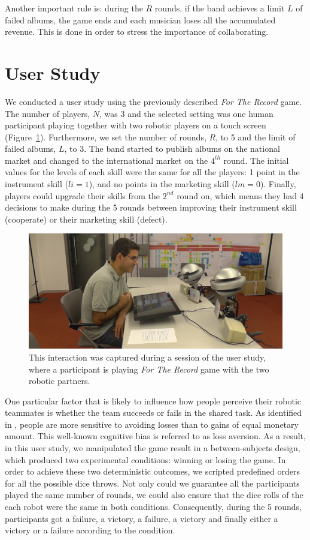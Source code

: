 Another important rule is: during the $R$ rounds, if the band achieves a limit $L$ of failed albums, the game ends and each musician loses all the accumulated revenue. This is done in order to stress the importance of collaborating.


\section{User Study}
\label{sec:study3}
We conducted a user study using the previously described \textit{For The Record} game. The number of players, $N$, was 3 and the selected setting was one human participant playing together with two robotic players on a touch screen (Figure~\ref{fig:interaction}).
Furthermore, we set the number of rounds, $R$, to 5 and the limit of failed albums, $L$, to 3. The band started to publish albums on the national market and changed to the international market on the $4^{th}$ round. The initial values for the levels of each skill were the same for all the players: 1 point in the instrument skill ($li=1$), and no points in the marketing skill ($lm=0$). Finally, players could upgrade their skills from the $2^{nd}$ round on, which means they had 4 decisions to make during the 5 rounds between improving their instrument skill (cooperate) or their marketing skill (defect).

\begin{figure}[ht]
    \centering
    \includegraphics[width=0.7\columnwidth]{images/prosociality/interaction1.png}
    \caption{This interaction was captured during a session of the user study, where a participant is playing \textit{For The Record} game with the two robotic partners.}
    \label{fig:interaction}
\end{figure}



One particular factor that is likely to influence how people perceive their robotic teammates is whether the team succeeds or fails in the shared task. As identified in \cite{kahneman2013choices}, people are more sensitive to avoiding losses than to gains of equal monetary amount. This well-known cognitive bias is referred to as loss aversion. As a result, in this user study, we manipulated the game result in a between-subjects design, which produced two experimental conditions: winning or losing the game. In order to achieve these two deterministic outcomes, we scripted predefined orders for all the possible dice throws. Not only could we guarantee all the participants played the same number of rounds, we could also ensure that the dice rolls of the each robot were the same in both conditions. Consequently, during the 5 rounds, participants got a failure, a victory, a failure, a victory and finally either a victory or a failure according to the condition.


